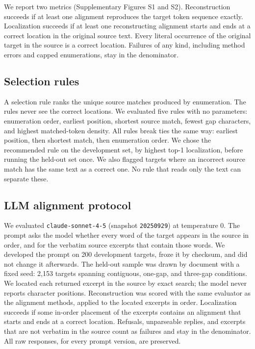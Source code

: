 \documentclass[10pt,twocolumn]{article}
\theoremstyle{plain}
\theoremstyle{definition}
\theoremstyle{remark}
\begin{document}
We report two metrics (Supplementary Figures S1 and S2). Reconstruction succeeds if at least one alignment reproduces the target token sequence exactly. Localization succeeds if at least one reconstructing alignment starts and ends at a correct location in the original source text. Every literal occurrence of the original target in the source is a correct location. Failures of any kind, including method errors and capped enumerations, stay in the denominator.

\subsection{Selection rules}
A selection rule ranks the unique source matches produced by enumeration. The rules never see the correct locations. We evaluated five rules with no parameters: enumeration order, earliest position, shortest source match, fewest gap characters, and highest matched-token density. All rules break ties the same way: earliest position, then shortest match, then enumeration order. We chose the recommended rule on the development set, by highest top-1 localization, before running the held-out set once. We also flagged targets where an incorrect source match has the same text as a correct one. No rule that reads only the text can separate these.

\subsection{LLM alignment protocol}
We evaluated \texttt{claude-sonnet-4-5} (snapshot \texttt{20250929}) at temperature 0. The prompt asks the model whether every word of the target appears in the source in order, and for the verbatim source excerpts that contain those words. We developed the prompt on 200 development targets, froze it by checksum, and did not change it afterwards. The held-out sample was drawn by document with a fixed seed: 2,153 targets spanning contiguous, one-gap, and three-gap conditions. We located each returned excerpt in the source by exact search; the model never reports character positions. Reconstruction was scored with the same evaluator as the alignment methods, applied to the located excerpts in order. Localization succeeds if some in-order placement of the excerpts contains an alignment that starts and ends at a correct location. Refusals, unparseable replies, and excerpts that are not verbatim in the source count as failures and stay in the denominator. All raw responses, for every prompt version, are preserved.
\end{document}
